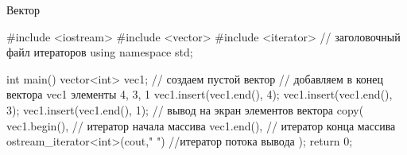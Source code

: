 \documentclass[
    9pt,
    hyperref={pdfencoding=unicode}
    ]{beamer}
\theoremstyle{definition}
\begin{document}
\begin{frame}[fragile]{Вектор}
    \begin{cppcode}
        #include <iostream>
        #include <vector>
        #include <iterator> // заголовочный файл итераторов
        using namespace std;
        
        int main()
        {
            vector<int> vec1; // создаем пустой вектор
            // добавляем в конец вектора vec1 элементы 4, 3, 1
            vec1.insert(vec1.end(), 4);
            vec1.insert(vec1.end(), 3);
            vec1.insert(vec1.end(), 1);
            // вывод на экран элементов вектора
            copy( vec1.begin(),   // итератор начала массива
                  vec1.end(),     // итератор конца массива
                  ostream_iterator<int>(cout," ")   //итератор потока вывода
            );
            return 0;
        }
    \end{cppcode}
\end{frame}
\end{document}
